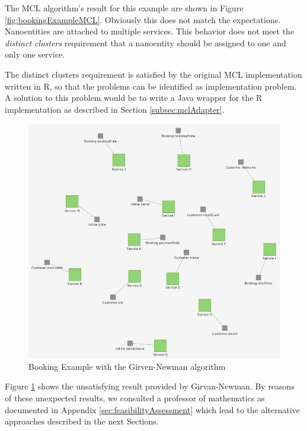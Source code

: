 The MCL algorithm's result for this example are shown in Figure \ref{fig:bookingExampleMCL}. Obviously this does not match the expectations. Nanoentities are attached to multiple services. This behavior does not meet the \textit{distinct clusters} requirement that a nanoentity should be assigned to one and only one service. 

The distinct clusters requirement is satisfied by the original MCL implementation written in R, so that the problems can be identified as implementation problem. A solution to this problem would be to write a Java wrapper for the R implementation as described in Section \ref{subsec:mclAdapter}.

\begin{figure}[H]
	\begin{center}
		\includegraphics[scale=0.65]{images/girvan_entities_fail.png}
	\end{center}
	\caption{Booking Example with the Girven-Newman algorithm}
	\label{fig:bookingExampleGirvan}
\end{figure}

Figure \ref{fig:bookingExampleGirvan} shows the unsatisfying result provided by Girvan-Newman. By reasons of these unexpected results, we consulted a professor of mathematics as documented in Appendix \ref{sec:feasibilityAssessment} which lead to the alternative approaches described in the next Sections.

